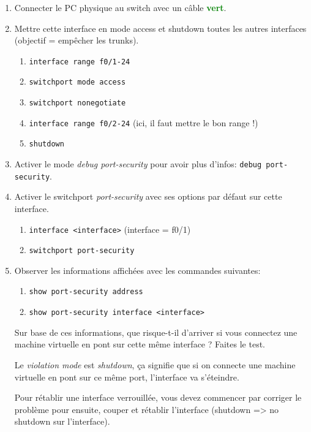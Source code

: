 \documentclass[a4paper]{article}
\begin{document}
\begin{enumerate}

\item Connecter le PC physique au switch avec un câble \textcolor{green}{\textbf{vert}}.

\item Mettre cette interface en mode access et shutdown toutes les autres interfaces (objectif = empêcher les trunks).
\begin{enumerate}
    \item \texttt{interface range f0/1-24}
    \item \texttt{switchport mode access}
    \item \texttt{switchport nonegotiate}
    \item \texttt{interface range f0/2-24} (ici, il faut mettre le bon range !)
    \item \texttt{shutdown}
\end{enumerate}

\item Activer le mode \textit{debug port-security} pour avoir plus d'infos: \texttt{debug port-security}.

\item Activer le switchport \textit{port-security} avec ses options par défaut sur cette interface.
\begin{enumerate}
    \item \texttt{interface <interface>} (interface = f0/1)
    \item \texttt{switchport port-security}
\end{enumerate}

\item Observer les informations affichées avec les commandes suivantes:
\begin{enumerate}
    \item \texttt{show port-security address}
    \item \texttt{show port-security interface <interface>}
\end{enumerate}
Sur base de ces informations, que risque-t-il d’arriver si vous connectez une machine virtuelle en pont sur cette même interface ? Faites le test.
\begin{example}
    Le \textit{violation mode} est \textit{shutdown}, ça signifie que si on connecte une machine virtuelle en pont sur ce même port, l'interface va s'éteindre.
\end{example}
Pour rétablir une interface verrouillée, vous devez commencer par corriger le problème pour ensuite, couper et rétablir l’interface (shutdown => no shutdown sur l’interface).

\end{enumerate}
\end{document}
